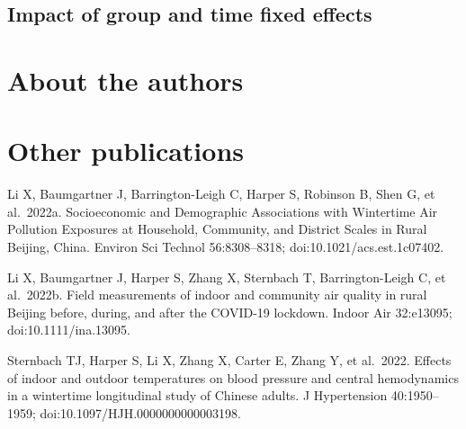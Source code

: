 \documentclass[
  letterpaper,
  DIV=11,
  numbers=noendperiod]{scrartcl}
\begin{document}
\subsection{Impact of group and time fixed
effects}\label{impact-of-group-and-time-fixed-effects}

\newpage

\section*{About the authors}\label{about-the-authors}

\section*{Other publications}\label{other-publications}

Li X, Baumgartner J, Barrington-Leigh C, Harper S, Robinson B, Shen G,
et al.~2022a. Socioeconomic and Demographic Associations with Wintertime
Air Pollution Exposures at Household, Community, and District Scales in
Rural Beijing, China. Environ Sci Technol 56:8308--8318;
doi:10.1021/acs.est.1c07402.

Li X, Baumgartner J, Harper S, Zhang X, Sternbach T, Barrington-Leigh C,
et al.~2022b. Field measurements of indoor and community air quality in
rural Beijing before, during, and after the COVID-19 lockdown. Indoor
Air 32:e13095; doi:10.1111/ina.13095.

Sternbach TJ, Harper S, Li X, Zhang X, Carter E, Zhang Y, et al.~2022.
Effects of indoor and outdoor temperatures on blood pressure and central
hemodynamics in a wintertime longitudinal study of Chinese adults. J
Hypertension 40:1950--1959; doi:10.1097/HJH.0000000000003198.
\end{document}

